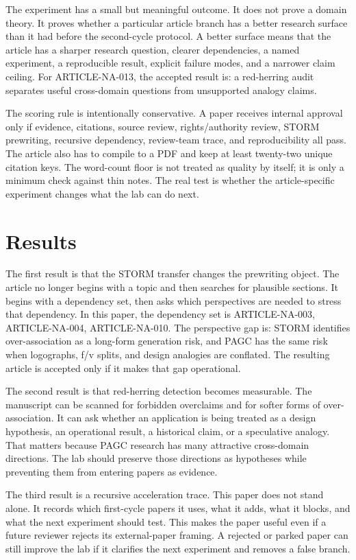 \documentclass[sigconf,nonacm]{acmart}
\begin{document}
The experiment has a small but meaningful outcome. It does not prove a domain
theory. It proves whether a particular article branch has a better research
surface than it had before the second-cycle protocol. A better surface means
that the article has a sharper research question, clearer dependencies, a named
experiment, a reproducible result, explicit failure modes, and a narrower claim
ceiling. For ARTICLE-NA-013, the accepted result is: a red-herring audit separates useful cross-domain questions from unsupported analogy claims.

The scoring rule is intentionally conservative. A paper receives internal
approval only if evidence, citations, source review, rights/authority review,
STORM prewriting, recursive dependency, review-team trace, and reproducibility
all pass. The article also has to compile to a PDF and keep at least twenty-two
unique citation keys. The word-count floor is not treated as quality by itself;
it is only a minimum check against thin notes. The real test is whether the
article-specific experiment changes what the lab can do next.

\section{Results}
The first result is that the STORM transfer changes the prewriting object. The
article no longer begins with a topic and then searches for plausible sections.
It begins with a dependency set, then asks which perspectives are needed to
stress that dependency. In this paper, the dependency set is ARTICLE-NA-003, ARTICLE-NA-004, ARTICLE-NA-010. The
perspective gap is: STORM identifies over-association as a long-form generation risk, and PAGC has the same risk when logographs, f/v splits, and design analogies are conflated. The resulting article is accepted only if it makes
that gap operational.

The second result is that red-herring detection becomes measurable. The
manuscript can be scanned for forbidden overclaims and for softer forms of
over-association. It can ask whether an application is being treated as a design
hypothesis, an operational result, a historical claim, or a speculative analogy.
That matters because PAGC research has many attractive cross-domain directions.
The lab should preserve those directions as hypotheses while preventing them
from entering papers as evidence.

The third result is a recursive acceleration trace. This paper does not stand
alone. It records which first-cycle papers it uses, what it adds, what it blocks,
and what the next experiment should test. This makes the paper useful even if a
future reviewer rejects its external-paper framing. A rejected or parked paper
can still improve the lab if it clarifies the next experiment and removes a
false branch.
\end{document}
